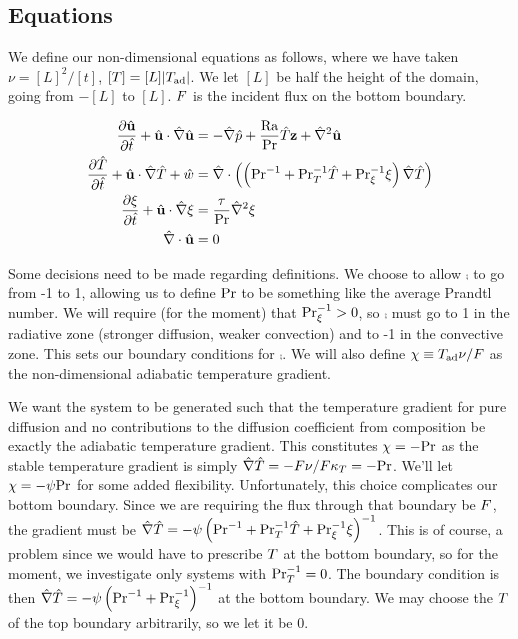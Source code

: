 \subsection{Equations} %
\label{sub:equations}

	We define our non-dimensional equations as follows, where we have taken $\nu=[L]^{2}/[t]$, $[T]=[L]|T_{\mathrm{ad}}|$.
	We let $[L]$ be half the height of the domain, going from $-[L]$ to $[L]$.
	$F$ is the incident flux on the bottom boundary.

	\begin{align}
		\frac{\partial{\hat{\mathbf{u}}}}{\partial{\hat{t}}}+\hat{\mathbf{u}}\cdot\hat{\nabla}\hat{\mathbf{u}}&=-\hat{\nabla}\hat{p}+\frac{\mathrm{Ra}}{\mathrm{Pr}}\hat{T}\mathbf{z}+\hat{\nabla}^{2}\hat{\mathbf{u}}\\
		\frac{\partial{\hat{T}}}{\partial{\hat{t}}}+\hat{\mathbf{u}}\cdot\hat{\nabla}\hat{T}+\hat{w}&=\hat{\nabla}\cdot\left(\left(\mathrm{Pr}^{-1}+\mathrm{Pr}_{T}^{-1}\hat{T}+\mathrm{Pr}_{\xi}^{-1}\xi\right)\hat{\nabla}\hat{T}\right)\\
		\frac{\partial{\xi}}{\partial{\hat{t}}}+\hat{\mathbf{u}}\cdot\hat{\nabla}\xi&=\frac{\tau}{\mathrm{Pr}}\hat{\nabla}^{2}\xi\\
		\hat{\nabla}\cdot\hat{\mathbf{u}}&=0
	\end{align}

	Some decisions need to be made regarding definitions.
	We choose to allow $\comp$ to go from -1 to 1, allowing us to define $\mathrm{Pr}$ to be something like the average Prandtl number.
	We will require (for the moment) that $\mathrm{Pr}_{\xi}^{-1}>0$, so $\comp$ must go to 1 in the radiative zone (stronger diffusion, weaker convection) and to -1 in the convective zone.
	This sets our boundary conditions for $\comp$.
	We will also define $\chi\equiv T_{\mathrm{ad}}\nu/F$ as the non-dimensional adiabatic temperature gradient.

	We want the system to be generated such that the temperature gradient for pure diffusion and no contributions to the diffusion coefficient from composition be exactly the adiabatic temperature gradient.
		This constitutes $\chi=-\mathrm{Pr}$ as the stable temperature gradient is simply $\hat{\nabla}\hat{T}=-F\nu/F\kappa_{T}=-\mathrm{Pr}$.
		We'll let $\chi=-\psi\mathrm{Pr}$ for some added flexibility.
	Unfortunately, this choice complicates our bottom boundary.
		Since we are requiring the flux through that boundary be $F$, the gradient must be $\hat{\nabla}\hat{T}=-\psi\left(\mathrm{Pr}^{-1}+\mathrm{Pr}_{T}^{-1}\hat{T}+\mathrm{Pr}_{\xi}^{-1}\xi\right)^{-1}$.
		This is of course, a problem since we would have to prescribe $T$ at the bottom boundary, so for the moment, we investigate only systems with $\mathrm{Pr}_{T}^{-1}=0$.
		The boundary condition is then $\hat{\nabla}\hat{T}=-\psi\left(\mathrm{Pr}^{-1}+\mathrm{Pr}_{\xi}^{-1}\right)^{-1}$ at the bottom boundary.
		We may choose the $T$ of the top boundary arbitrarily, so we let it be 0.


